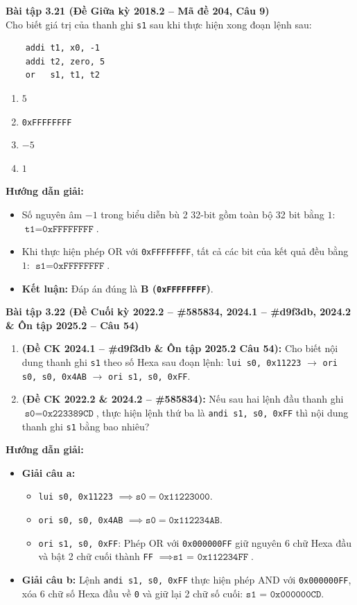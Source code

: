 \textbf{Bài tập 3.21 (Đề Giữa kỳ 2018.2 -- Mã đề 204, Câu 9)}\\
Cho biết giá trị của thanh ghi \texttt{s1} sau khi thực hiện xong đoạn lệnh sau:
\begin{lstlisting}
    addi t1, x0, -1
    addi t2, zero, 5
    or   s1, t1, t2
\end{lstlisting}
\begin{enumerate}[label=\Alph*.]
    \item $5$
    \item \texttt{0xFFFFFFFF}
    \item $-5$
    \item $1$
\end{enumerate}
\textbf{Hướng dẫn giải:}
\begin{itemize}
    \item Số nguyên âm $-1$ trong biểu diễn bù 2 32-bit gồm toàn bộ 32 bit bằng $1$: $\texttt{t1} = \texttt{0xFFFFFFFF}$.
    \item Khi thực hiện phép OR với \texttt{0xFFFFFFFF}, tất cả các bit của kết quả đều bằng $1$: $\texttt{s1} = \texttt{0xFFFFFFFF}$.
    \item \textbf{Kết luận:} Đáp án đúng là \textbf{B (\texttt{0xFFFFFFFF})}.
\end{itemize}

\textbf{Bài tập 3.22 (Đề Cuối kỳ 2022.2 -- \#585834, 2024.1 -- \#d9f3db, 2024.2 \& Ôn tập 2025.2 -- Câu 54)}
\begin{enumerate}[label=\alph*)]
    \item \textbf{(Đề CK 2024.1 -- \#d9f3db \& Ôn tập 2025.2 Câu 54):} Cho biết nội dung thanh ghi \texttt{s1} theo số Hexa sau đoạn lệnh: \texttt{lui s0, 0x11223} $\rightarrow$ \texttt{ori s0, s0, 0x4AB} $\rightarrow$ \texttt{ori s1, s0, 0xFF}.
    \item \textbf{(Đề CK 2022.2 \& 2024.2 -- \#585834):} Nếu sau hai lệnh đầu thanh ghi $\texttt{s0} = \texttt{0x223389CD}$, thực hiện lệnh thứ ba là \texttt{andi s1, s0, 0xFF} thì nội dung thanh ghi \texttt{s1} bằng bao nhiêu?
\end{enumerate}
\textbf{Hướng dẫn giải:}
\begin{itemize}
    \item \textbf{Giải câu a:}
    \begin{itemize}
        \item \texttt{lui s0, 0x11223} $\implies \texttt{s0} = \texttt{0x11223000}$.
        \item \texttt{ori s0, s0, 0x4AB} $\implies \texttt{s0} = \texttt{0x112234AB}$.
        \item \texttt{ori s1, s0, 0xFF}: Phép OR với \texttt{0x000000FF} giữ nguyên 6 chữ Hexa đầu và bật 2 chữ cuối thành \texttt{FF} $\implies \mathbf{\texttt{s1 = 0x112234FF}}$.
    \end{itemize}
    \item \textbf{Giải câu b:} Lệnh \texttt{andi s1, s0, 0xFF} thực hiện phép AND với \texttt{0x000000FF}, xóa 6 chữ số Hexa đầu về \texttt{0} và giữ lại 2 chữ số cuối: $\mathbf{\texttt{s1 = 0x000000CD}}$.
\end{itemize}

